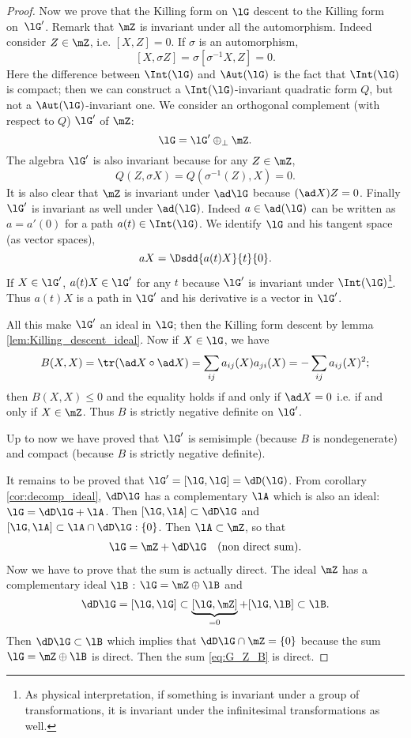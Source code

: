 \begin{proof}
Now we prove that the Killing form on $\lG$ descent to the Killing form on~$\lG'$. Remark that $\mZ$ is invariant under all the automorphism. Indeed consider $Z\in\mZ$, i.e.  $[X,Z]=0$. If $\sigma$ is an automorphism, 
\[
   [X,\sigma Z]=\sigma[\sigma^{-1} X,Z]=0.
\]
Here the difference between $\Int(\lG)$ and $\Aut(\lG)$ is the fact that $\Int(\lG)$ is compact; then we can construct a $\Int(\lG)$-invariant quadratic form $Q$, but not a $\Aut(\lG)$-invariant one. We consider an orthogonal complement (with respect to $Q$) $\lG'$ of $\mZ$:
\begin{equation}
   \lG=\lG'\oplus_{\perp}\mZ.
\end{equation}
The algebra $\lG'$ is also invariant because for any $Z\in\mZ$, 
\[
Q(Z,\sigma X)=Q(\sigma^{-1}(Z),X)=0.
\]
It is also clear that $\mZ$ is invariant under $\ad\lG$ because $(\ad X)Z=0$. Finally $\lG'$ is invariant as well under $\ad(\lG)$. Indeed $a\in\ad(\lG)$ can be written as $a=a'(0)$ for a path $a(t)\in\Int(\lG)$. We identify $\lG$ and his tangent space (as vector spaces),
\[
  aX=\Dsdd{ a(t)X }{t}{0}.
\]
If $X\in\lG'$, $a(t)X\in\lG'$ for any $t$ because $\lG'$ is invariant under $\Int(\lG)$\footnote{As physical interpretation, if something is invariant under a group of transformations, it is invariant under the infinitesimal transformations as well.}. Thus $a(t)X$ is a path in $\lG'$ and his derivative is a vector in $\lG'$. 

All this make $\lG'$ an ideal in $\lG$; then the Killing form descent by lemma \ref{lem:Killing_descent_ideal}. Now if $X\in\lG$, we have
\begin{equation}
  B(X,X)=\tr(\ad X\circ\ad X)
        =\sum_{ij}a_{ij}(X)a_{ji}(X)
    =-\sum_{ij}a_{ij}(X)^2;
\end{equation}
then $B(X,X)\leq 0$ and the equality holds if and only if $\ad X=0$ i.e. if and only if $X\in\mZ$. Thus $B$ is strictly negative definite on $\lG'$.

Up to now we have proved that $\lG'$ is semisimple (because $B$ is nondegenerate) and compact (because $B$ is strictly negative definite).

It remains to be proved that $\lG'=[\lG,\lG]=\dD(\lG)$. From corollary \ref{cor:decomp_ideal}, $\dD\lG$ has a complementary $\lA$ which is also an ideal: $\lG=\dD\lG+\lA$. Then $[\lG,\lA]\subset\dD\lG$ and $[\lG,\lA]\subset\lA\cap\dD\lG:\{0\}$. Then $\lA\subset\mZ$, so that
\begin{align}\label{eq:G_Z_B}
   \lG=\mZ+\dD\lG&&\text{(non direct sum)}.
\end{align}
Now we have to prove that the sum is actually direct. The ideal $\mZ$ has a complementary ideal $\lB$ : $\lG=\mZ\oplus\lB$ and
\[
   \dD\lG=[\lG,\lG]\subset\underbrace{[\lG,\mZ]}_{=0}+[\lG,\lB]\subset\lB.
\]
Then $\dD\lG\subset\lB$ which implies that $\dD\lG\cap\mZ=\{0\}$ because the sum $\lG=\mZ\oplus\lB$ is direct. Then the sum \eqref{eq:G_Z_B} is direct.

\end{proof}

